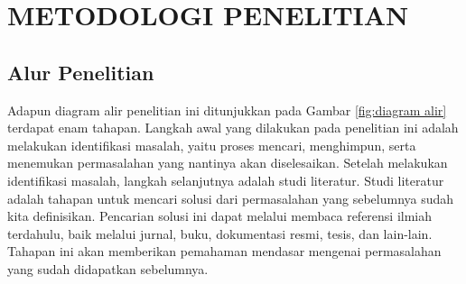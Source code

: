 \chapter{METODOLOGI PENELITIAN}
%


\section{Alur Penelitian}
Adapun diagram alir penelitian ini ditunjukkan pada Gambar \ref{fig:diagram alir} terdapat enam tahapan. Langkah awal yang dilakukan pada penelitian ini adalah melakukan identifikasi masalah, yaitu proses mencari, menghimpun, serta menemukan permasalahan yang nantinya akan diselesaikan. Setelah melakukan identifikasi masalah, langkah selanjutnya adalah studi literatur. Studi literatur adalah tahapan untuk mencari solusi dari permasalahan yang sebelumnya sudah kita definisikan. Pencarian solusi ini dapat melalui membaca referensi ilmiah terdahulu, baik melalui jurnal, buku, dokumentasi resmi, tesis, dan lain-lain. Tahapan ini akan memberikan pemahaman mendasar mengenai permasalahan yang sudah didapatkan sebelumnya. 
        
